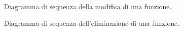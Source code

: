 \begin{figure}[H]
	\noindent
	\caption{Diagramma di sequenza della modifica di una funzione.}
\end{figure}

\begin{figure}[H]
	\noindent
	\caption{Diagramma di sequenza dell'eliminazione di una funzione.}
\end{figure}


